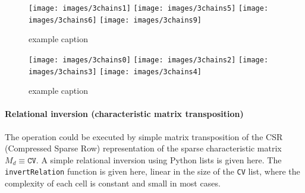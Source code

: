 \documentclass[11pt,oneside]{article}	%
\begin{document}
\begin{figure}[htbp] %
   \centering
   \texttt{[image: images/3chains1]} 
   \texttt{[image: images/3chains5]} 
   \texttt{[image: images/3chains6]} 
   \texttt{[image: images/3chains9]} 
   \caption{example caption}
   \label{fig:example}
\end{figure}

\begin{figure}[htbp] %
   \centering
   \texttt{[image: images/3chains0]} 
   \texttt{[image: images/3chains2]} 
   \texttt{[image: images/3chains3]} 
   \texttt{[image: images/3chains4]} 
   \caption{example caption}
   \label{fig:example}
\end{figure}

\paragraph{Relational inversion (characteristic matrix transposition)}

The operation could be executed by simple matrix transposition of the CSR (Compressed Sparse Row) representation of the sparse characteristic matrix $M_d \equiv \texttt{CV}$.
A simple relational inversion using Python lists is given here. The \texttt{invertRelation} function 
is given here, linear in the size of the \texttt{CV} list, where the complexity of each cell is constant and 
small in most cases.
\end{document}
